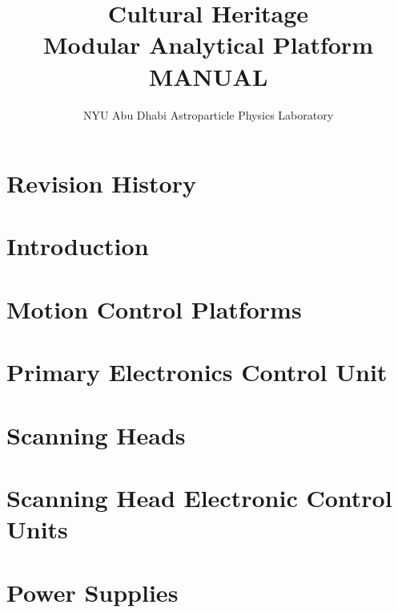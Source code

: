 \documentclass{ol-softwaremanual}
\title{Cultural Heritage \\ Modular Analytical Platform \\ MANUAL}
\author{NYU Abu Dhabi Astroparticle Physics Laboratory}
\begin{document}
\maketitle

\tableofcontents

\newpage
\section{Revision History}


\newpage
\section{Introduction}


\newpage
\section{Motion Control Platforms}


\newpage
\section{Primary Electronics Control Unit}


\newpage
\section{Scanning Heads}


\newpage
\section{Scanning Head Electronic Control Units}



\newpage
\section{Power Supplies}
\end{document}
